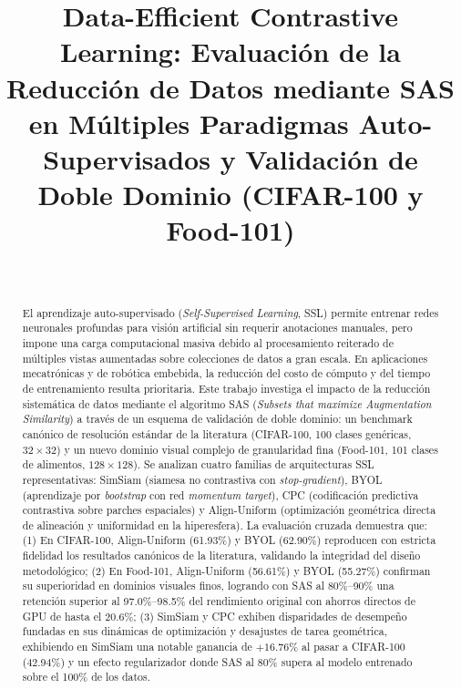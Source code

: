 \documentclass[journal,10pt,twocolumn]{IEEEtran}
\begin{document}
\title{Data-Efficient Contrastive Learning: Evaluación de la Reducción de Datos mediante SAS en Múltiples Paradigmas Auto-Supervisados y Validación de Doble Dominio (CIFAR-100 y Food-101)}

\author{
     \\
}

\maketitle

\begin{abstract}
El aprendizaje auto-supervisado (\textit{Self-Supervised Learning}, SSL) permite entrenar redes neuronales profundas para visión artificial sin requerir anotaciones manuales, pero impone una carga computacional masiva debido al procesamiento reiterado de múltiples vistas aumentadas sobre colecciones de datos a gran escala. En aplicaciones mecatrónicas y de robótica embebida, la reducción del costo de cómputo y del tiempo de entrenamiento resulta prioritaria. Este trabajo investiga el impacto de la reducción sistemática de datos mediante el algoritmo SAS (\textit{Subsets that maximize Augmentation Similarity}) a través de un esquema de validación de doble dominio: un benchmark canónico de resolución estándar de la literatura (CIFAR-100, 100 clases genéricas, $32 \times 32$) y un nuevo dominio visual complejo de granularidad fina (Food-101, 101 clases de alimentos, $128 \times 128$). Se analizan cuatro familias de arquitecturas SSL representativas: SimSiam (siamesa no contrastiva con \textit{stop-gradient}), BYOL (aprendizaje por \textit{bootstrap} con red \textit{momentum target}), CPC (codificación predictiva contrastiva sobre parches espaciales) y Align-Uniform (optimización geométrica directa de alineación y uniformidad en la hiperesfera). La evaluación cruzada demuestra que: (1) En CIFAR-100, Align-Uniform (61.93\%) y BYOL (62.90\%) reproducen con estricta fidelidad los resultados canónicos de la literatura, validando la integridad del diseño metodológico; (2) En Food-101, Align-Uniform (56.61\%) y BYOL (55.27\%) confirman su superioridad en dominios visuales finos, logrando con SAS al 80\%--90\% una retención superior al 97.0\%--98.5\% del rendimiento original con ahorros directos de GPU de hasta el 20.6\%; (3) SimSiam y CPC exhiben disparidades de desempeño fundadas en sus dinámicas de optimización y desajustes de tarea geométrica, exhibiendo en SimSiam una notable ganancia de $+16.76\%$ al pasar a CIFAR-100 (42.94\%) y un efecto regularizador donde SAS al 80\% supera al modelo entrenado sobre el 100\% de los datos.
\end{abstract}
\end{document}
